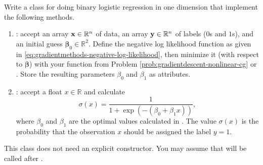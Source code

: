 \begin{problem}
Write a class for doing binary logistic regression in one dimension that implement the following methods.
\begin{enumerate}
\item {}: accept an array $\mathbf{x}\in\mathbb{R}^n$ of data, an array $\mathbf{y}\in\mathbb{R}^n$ of labels ($0$s and $1$s), and an initial guess $\boldsymbol{\beta}_0\in\mathbb{R}^2$.
Define the negative log likelihood function as given in \eqref{eq:gradientmethods-negative-log-likelihood}, then minimize it (with respect to $\boldsymbol{\beta}$) with your function from Problem \ref{prob:gradientdescent-nonlinear-cg} or .
Store the resulting parameters $\beta_0$ and $\beta_1$ as attributes.

\item {}: accept a float $x\in\mathbb{R}$ and calculate
\[\sigma(x) = \frac{1}{1 + \exp(- (\beta_0 + \beta_1 x))},\]
where $\beta_0$ and $\beta_1$ are the optimal values calculated in .
The value $\sigma(x)$ is the probability that the observation $x$ should be assigned the label $y=1$.
\end{enumerate}
This class does not need an explicit constructor.
You may assume that  will be called after .
\label{prob:gradientmethods-logistic-regression}
\end{problem}

